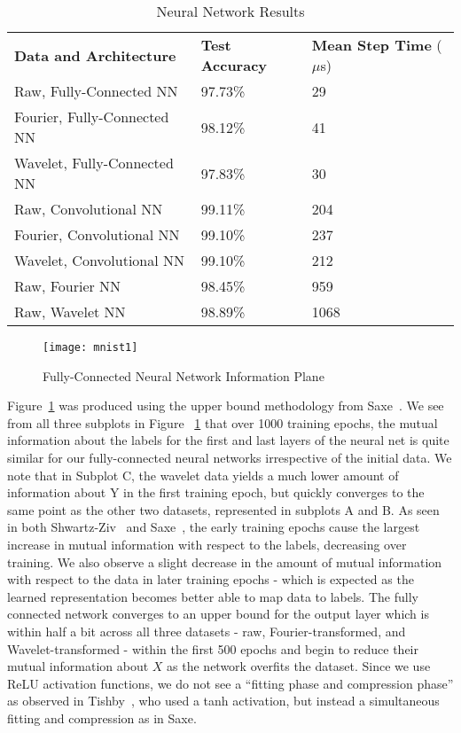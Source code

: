 \begin{table}[h!]
\centering	
\begin{tabular}{l|ll}
\textbf{Data and Architecture}  & \textbf{Test Accuracy} & \textbf{Mean Step Time} ($\mu$s) \\\cline{1-3}
Raw, Fully-Connected NN            & 97.73\%         & 29\\
Fourier, Fully-Connected NN        & 98.12\%         & 41\\
Wavelet, Fully-Connected NN        & 97.83\%         & 30\\
\hline
Raw, Convolutional NN              & 99.11\%         & 204\\ 
Fourier, Convolutional NN          & 99.10\%         & 237\\
Wavelet, Convolutional NN          & 99.10\%         & 212\\
\hline
Raw, Fourier NN                    & 98.45\%         & 959\\
Raw, Wavelet NN                    & 98.89\%         & 1068\\ 
\end{tabular}
\caption{Neural Network Results}
\label{Tab:test}
\end{table}

\begin{figure}[h]
\begin{center}
\texttt{[image: mnist1]}
\caption{Fully-Connected Neural Network Information Plane}
\label{fig:mnist fc infoplane}
\centering
\end{center}
\end{figure}
Figure~\ref{fig:mnist fc infoplane} was produced using the upper bound methodology from Saxe~\cite{saxe2019information}. 
We see from all three subplots in Figure ~\ref{fig:mnist fc infoplane} that over 1000 training epochs, the mutual information about the labels for the first and last layers of the neural net is quite similar for our fully-connected neural networks irrespective of the initial data.
We note that in Subplot C, the wavelet data yields a much lower amount of information about Y in the first training epoch, but quickly converges to the same point as the other two datasets, represented in subplots A and B.
As seen in both Shwartz-Ziv~\cite{shwartz2017opening} and Saxe~\cite{saxe2019information}, the early training epochs cause the largest increase in mutual information with respect to the labels, decreasing over training. 
We also observe a slight decrease in the amount of mutual information with respect to the data in later training epochs - which is expected as the learned representation becomes better able to map data to labels. 
The fully connected network converges to an upper bound for the output layer which is within half a bit across all three datasets - raw, Fourier-transformed, and Wavelet-transformed - within the first 500 epochs and begin to reduce their mutual information about $X$ as the network overfits the dataset.
Since we use ReLU activation functions, we do not see a ``fitting phase and compression phase'' as observed in Tishby~\cite{tishby2015deep}, who used a tanh activation, but instead a simultaneous fitting and compression as in Saxe.

